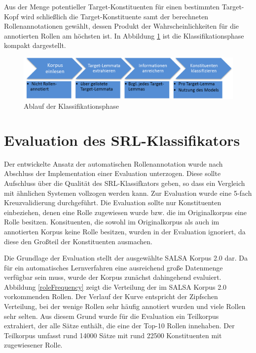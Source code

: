 \documentclass[12pt]{article}
\begin{document}
Aus der Menge potentieller Target-Konstituenten für einen bestimmten Target-Kopf wird schließlich die Target-Konstituente samt der berechneten Rollenannotationen gewählt, dessen Produkt der Wahrscheinlichkeiten für die annotierten Rollen am höchsten ist.
In Abbildung \ref{classify} ist die Klassifikationsphase kompakt dargestellt.

	\begin{figure}[tb!]
		\centering
		\includegraphics[scale=0.6]{images/ablaufAnnotate.png}
		\caption{Ablauf der Klassifikationsphase}
		\label{classify}
	\end{figure}

\newpage
\section{Evaluation des SRL-Klassifikators}

Der entwickelte Ansatz der automatischen Rollenannotation wurde nach Abschluss
der Implementation einer Evaluation unterzogen. Diese sollte Aufschluss über die
Qualität des SRL-Klassifkators geben, so dass ein Vergleich mit ähnlichen
Systemen vollzogen werden kann. Zur Evaluation wurde eine 5-fach Kreuzvalidierung durchgeführt. Die Evaluation sollte nur Konstituenten einbeziehen, denen eine Rolle zugewiesen wurde bzw. die im Originalkorpus eine Rolle besitzen. Konsituenten, die sowohl im Originalkorpus als auch im annotierten Korpus keine Rolle besitzen, wurden in der Evaluation ignoriert, da diese den Großteil der Konstituenten ausmachen.

Die Grundlage der Evaluation stellt der ausgewählte SALSA Korpus 2.0 dar. Da für ein automatisches Lernverfahren eine ausreichend große Datenmenge verfügbar sein muss, wurde der Korpus zunächst dahingehend evaluiert. Abbildung \ref{roleFrequency} zeigt die Verteilung der im SALSA Korpus 2.0 vorkommenden Rollen. Der Verlauf der Kurve entspricht der Zipfschen Verteilung, bei der wenige Rollen sehr häufig annotiert wurden und viele Rollen sehr selten. Aus diesem Grund wurde für die Evaluation ein Teilkorpus extrahiert, der alle Sätze enthält, die eine der Top-10 Rollen innehaben. Der Teilkorpus umfasst rund 14000 Sätze mit rund 22500 Konstituenten mit zugewiesener Rolle.
\end{document}
